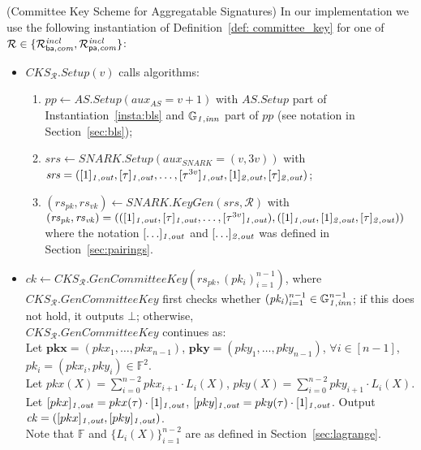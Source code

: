 \begin{construction}(Committee Key Scheme for Aggregatable Signatures)
\label{inst:cks} In our implementation we use the following instantiation of Definition~\ref{def: committee_key} for one of $\mathcal{R} \in \{\mathcal{R}^{\mathit{incl}}_{\mathsf{ba},\mathit{com}}, \mathcal{R}^{\mathit{incl}}_{\mathsf{pa},\mathit{com}}\}$:
\begin{itemize}
\item $\mathit{CKS_{\mathcal{R}}.Setup}(v)$ calls algorithms: 
\begin{enumerate}
\item $\mathit{pp} \leftarrow \mathit{AS.Setup}(\mathit{aux_{\mathit{AS}}}= v+1)$ with  $\mathit{AS.Setup}$ part of Instantiation~\ref{insta:bls} and 
$\mathbb{G}_{\mathit{1,inn}}$ part of $\mathit{pp}$ (see notation in Section~\ref{sec:bls});
\item $\mathit{srs} \leftarrow \mathit{SNARK.Setup}(\mathit{aux_{\mathit{SNARK}}} = (v, 3v))$ with \\
$\mathit{srs}=([1]_{\mathit{1,out}}, [\tau]_{\mathit{1,out}}, \ldots, [\tau^{3v}]_{\mathit{1,out}}, [1]_{\mathit{2,out}}, [\tau]_{\mathit{2,out}})$;
\item $(\mathit{rs}_{\mathit{pk}}, \mathit{rs}_{\mathit{vk}}) \leftarrow \mathit{SNARK.KeyGen}(\mathit{srs}, \mathcal{R})$ with \\ 
$(\mathit{rs}_{\mathit{pk}}, \mathit{rs}_{\mathit{vk}}) =  (([1]_{\mathit{1,out}}, [\tau]_{\mathit{1,out}}, \ldots, [\tau^{3v}]_{\mathit{1,out}}), \\ 
([1]_{\mathit{1,out}}, [1]_{\mathit{2,out}}, [\tau]_{\mathit{2,out}}))$ where %
the notation $[\ldots]_{\mathit{1,out}}$ and $[\ldots]_{\mathit{2,out}}$ was defined in Section~\ref{sec:pairings}.
\end{enumerate}

\item $\mathit{ck} \leftarrow \mathit{CKS_{\mathcal{R}}.GenCommitteeKey}(\mathit{rs_{pk}}, (\mathit{pk_i})_{i=1}^{n-1})$, where 
$\mathit{CKS_{\mathcal{R}}.GenCommitteeKey}$ first checks whether $(\mathit{pk_i})_{i=1}^{n-1} \in \mathbb{G}_{\mathit{1,inn}}^{n-1}$; 
{\color{red} if this does not hold}, it outputs $\bot$; otherwise, \\$\mathit{CKS_{\mathcal{R}}.GenCommitteeKey}$ continues as: \\
\noindent Let $\mathbf{pkx} = (\mathit{pkx_{1}}, \ldots, \mathit{pkx_{n-1}})$, $\mathbf{pky} = (\mathit{pky_{1}}, \ldots, \mathit{pky_{n-1}})$, $\forall i \in [n-1]$, $\mathit{pk_i} = (\mathit{pkx_i}, \mathit{pky_i}) \in \mathbb{F}^{2}$. \\
\noindent Let $pkx(X) = \sum_{i=0}^{n-2} \mathit{pkx_{i+1}} \cdot L_i(X)$, $pky(X) = \sum_{i=0}^{n-2} \mathit{pky_{i+1}} \cdot L_i(X)$. Let $[pkx]_{\mathit{1,out}} = pkx(\tau) \cdot [1]_{\mathit{1,out}}$, $[pky]_{\mathit{1,out}} = pky(\tau) \cdot [1]_{\mathit{1,out}}$. Output $\mathit{ck} = ([pkx]_{\mathit{1,out}}, [pky]_{\mathit{1,out}})$.\\
\noindent Note that $\mathbb{F}$ and $\{L_i(X)\}_{i=1}^{n-2}$ are as defined in Section~\ref{sec:lagrange}. 


\end{itemize}
\end{construction}
